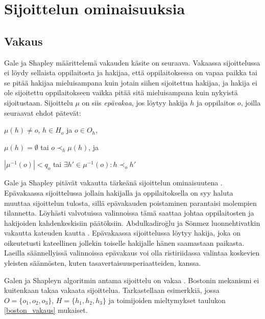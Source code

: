 \documentclass[twoside]{tktltiki}
\begin{document}
\section{Sijoittelun ominaisuuksia}
\label{ominaisuus_luku}
\subsection{Vakaus}

Gale ja Shapley määrittelemä vakauden käsite \cite{galeshapley62} on
seuraava. Vakaassa sijoittelussa ei löydy sellaista oppilaitosta ja
hakijaa, että oppilaitoksessa on vapaa paikka tai se pitää hakijaa
mieluisampana kuin jotain siihen sijoitettua hakijaa, ja hakija ei ole
sijoitettu oppilaitokseen vaikka pitää sitä mieluisampana kuin
nykyistä sijoitustaan. Sijoittelu $\mu$ on siis \emph{epävakaa}, jos
löytyy hakija $h$ ja oppilaitos $o$, joilla seuraavat ehdot pätevät:

\begin{itemize*}
  \item $\mu(h) \neq o$, $h \in H_o$ ja $o \in O_h$,
  \item $\mu(h) = \emptyset$ tai $o \prec_h \mu(h)$, ja
  \item $|\mu^{-1}(o)| < q_o$ tai $\exists h' \in \mu^{-1}(o): h
    \prec_o h'$
\end{itemize*}

\enlargethispage{\baselineskip}
Gale ja Shapley pitävät vakautta tärkeänä sijoittelun ominaisuutena
\cite{galeshapley62}. Epävakaassa sijoittelussa jollain hakijalla ja
oppilaitoksella on syy haluta muuttaa sijoittelun tulosta, sillä
epävakauden poistaminen parantaisi molempien tilannetta. Löyhästi
valvotuissa valinnoissa tämä saattaa johtaa oppilaitosten ja
hakijoiden kahdenkeskisiin päätöksiin. Abdulkadiroğlu ja Sönmez
luonnehtivatkin vakautta kateuden kautta \cite{abduson03}. Epävakaassa
sijoittelussa löytyy hakija, joka on oikeutetusti kateellinen jollekin
toiselle hakijalle hänen saamastaan paikasta. Laeilla säännellyissä
valinnoissa epävakaus voi olla ristiriidassa valintaa koskevien
yleisten säännösten, kuten tasavertaisuusperiaatteiden, kanssa.

Galen ja Shapleyn algoritmin antama sijoittelu on vakaa
\cite{galeshapley62, gusfield89}. Bostonin mekanismi ei kuitenkaan
takaa vakaata sijoittelua. Tarkastellaan esimerkkiä, jossa $O = \{o_1,
o_2, o_3\}$, $H = \{h_1, h_2, h_3\}$ ja toimijoiden mieltymykset
taulukon \ref{boston_vakaus} mukaiset.
\end{document}
